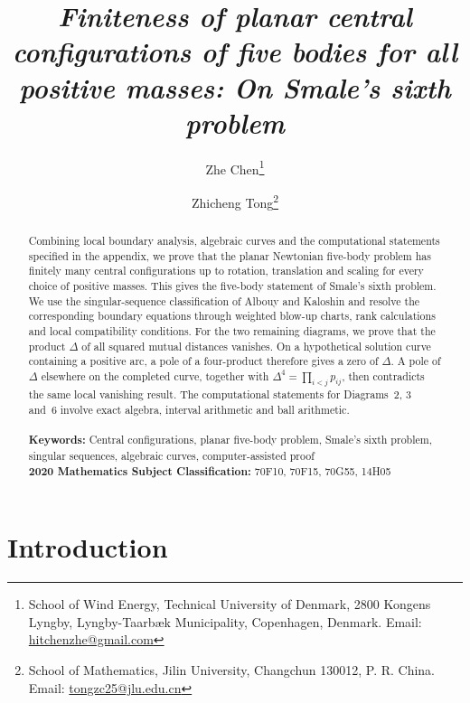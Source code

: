\documentclass[Threeside,11pt]{article}
\theoremstyle{definition}
\theoremstyle{remark}
\numberwithin{equation}{section}
\theoremstyle{remark}
\begin{document}
\title{{\sl Finiteness of planar central configurations of five
bodies for all positive masses: On Smale's sixth problem}}
\author{Zhe Chen\thanks{School of Wind Energy, Technical University of Denmark,
2800 Kongens Lyngby, Lyngby-Taarb\ae k Municipality, Copenhagen, Denmark.
Email: \url{hitchenzhe@gmail.com}}
\and
Zhicheng Tong\thanks{School of Mathematics, Jilin University,
Changchun 130012, P. R. China. Email: \url{tongzc25@jlu.edu.cn}}}
\date{}
\maketitle

\begin{abstract}
{
Combining local boundary analysis, algebraic curves and the computational
statements specified in the appendix, we prove that the planar Newtonian
five-body problem has finitely many central configurations up to rotation,
translation and scaling for every choice of positive masses. This gives the
five-body statement of Smale's sixth problem. We use the singular-sequence
classification of Albouy and Kaloshin and resolve the corresponding boundary
equations through weighted blow-up charts, rank calculations and local
compatibility conditions. For the two remaining diagrams, we prove that the
product $\Delta$ of all squared mutual distances vanishes. On a hypothetical
solution curve containing a positive arc, a pole of a four-product therefore
gives a zero of $\Delta$. A pole of $\Delta$ elsewhere on the completed curve,
together with $\Delta^4=\prod_{i<j}p_{ij}$, then contradicts the same local
vanishing result. The computational statements for Diagrams~2, 3 and~6 involve
exact algebra, interval arithmetic and ball arithmetic.
}
\\
        \\
        {\bf Keywords:} {Central configurations, planar five-body problem,
        Smale's sixth problem, singular sequences, algebraic curves, computer-assisted proof}
        \vspace{2mm}
        \\
        {\bf2020 Mathematics Subject Classification:} {70F10, %
        70F15, %
        70G55, %
        14H05 %
}
\end{abstract}

\tableofcontents


\section{Introduction}\label{sec:intro}
\end{document}
